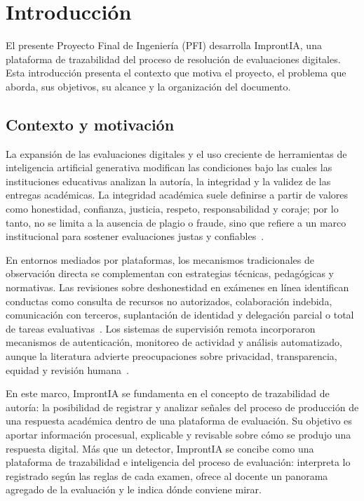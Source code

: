 \chapter{Introducción}
\label{ch:introduccion}

El presente Proyecto Final de Ingeniería (PFI) desarrolla ImprontIA, una plataforma de trazabilidad del proceso de resolución de evaluaciones digitales. Esta introducción presenta el contexto que motiva el proyecto, el problema que aborda, sus objetivos, su alcance y la organización del documento.

\section{Contexto y motivación}
\label{sec:intro_contexto}

La expansión de las evaluaciones digitales y el uso creciente de herramientas de inteligencia artificial generativa modifican las condiciones bajo las cuales las instituciones educativas analizan la autoría, la integridad y la validez de las entregas académicas. La integridad académica suele definirse a partir de valores como honestidad, confianza, justicia, respeto, responsabilidad y coraje; por lo tanto, no se limita a la ausencia de plagio o fraude, sino que refiere a un marco institucional para sostener evaluaciones justas y confiables~\parencite{ICAI2021}.

En entornos mediados por plataformas, los mecanismos tradicionales de observación directa se complementan con estrategias técnicas, pedagógicas y normativas. Las revisiones sobre deshonestidad en exámenes en línea identifican conductas como consulta de recursos no autorizados, colaboración indebida, comunicación con terceros, suplantación de identidad y delegación parcial o total de tareas evaluativas~\parencite{Noorbehbahani2022, Newton2024}. Los sistemas de supervisión remota incorporaron mecanismos de autenticación, monitoreo de actividad y análisis automatizado, aunque la literatura advierte preocupaciones sobre privacidad, transparencia, equidad y revisión humana~\parencite{Nigam2021, Mutimukwe2023}.

En este marco, ImprontIA se fundamenta en el concepto de trazabilidad de autoría: la posibilidad de registrar y analizar señales del proceso de producción de una respuesta académica dentro de una plataforma de evaluación. Su objetivo es aportar información procesual, explicable y revisable sobre cómo se produjo una respuesta digital. Más que un detector, ImprontIA se concibe como una plataforma de trazabilidad e inteligencia del proceso de evaluación: interpreta lo registrado según las reglas de cada examen, ofrece al docente un panorama agregado de la evaluación y le indica dónde conviene mirar.


